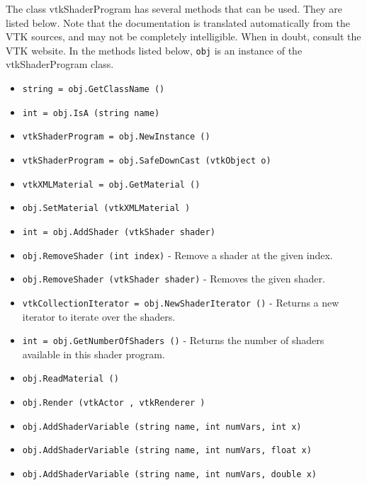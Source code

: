 The class vtkShaderProgram has several methods that can be used.
  They are listed below.
Note that the documentation is translated automatically from the VTK sources,
and may not be completely intelligible.  When in doubt, consult the VTK website.
In the methods listed below, \verb|obj| is an instance of the vtkShaderProgram class.
\begin{itemize}
\item  \verb|string = obj.GetClassName ()|

\item  \verb|int = obj.IsA (string name)|

\item  \verb|vtkShaderProgram = obj.NewInstance ()|

\item  \verb|vtkShaderProgram = obj.SafeDownCast (vtkObject o)|

\item  \verb|vtkXMLMaterial = obj.GetMaterial ()|

\item  \verb|obj.SetMaterial (vtkXMLMaterial )|

\item  \verb|int = obj.AddShader (vtkShader shader)|

\item  \verb|obj.RemoveShader (int index)| -  Remove a shader at the given index.

\item  \verb|obj.RemoveShader (vtkShader shader)| -  Removes the given shader.

\item  \verb|vtkCollectionIterator = obj.NewShaderIterator ()| -  Returns a new iterator to iterate over the shaders.

\item  \verb|int = obj.GetNumberOfShaders ()| -  Returns the number of shaders available in this
 shader program.

\item  \verb|obj.ReadMaterial ()|

\item  \verb|obj.Render (vtkActor , vtkRenderer )|

\item  \verb|obj.AddShaderVariable (string name, int numVars, int x)|

\item  \verb|obj.AddShaderVariable (string name, int numVars, float x)|

\item  \verb|obj.AddShaderVariable (string name, int numVars, double x)|


\end{itemize}
